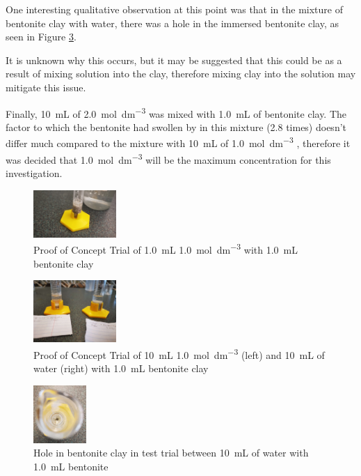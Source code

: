 \documentclass[11pt, letterpaper]{article}
\begin{document}
One interesting qualitative observation at this point was that
in the mixture of bentonite clay with water, there was a hole
in the immersed bentonite clay, as seen in Figure \ref*{fig:hole}.

It is unknown why this occurs, but it may be suggested that
this could be as a result of mixing solution into the clay,
therefore mixing clay into the solution may mitigate this issue.

Finally, \SI{10}{mL} of \SI{2.0}{mol.dm^{-3}} was mixed with \SI{1.0}{mL}
of bentonite clay. The factor to which the bentonite had swollen by
in this mixture (2.8 times) doesn't differ much compared to the
mixture with \SI{10}{mL} of \SI{1.0}{mol.dm^{-3}} , therefore
it was decided that \SI{1.0}{mol.dm^{-3}} will be the maximum
concentration for this investigation.






\begin{paracol}{3}

    \begin{figure}[H]
        \centering
        \includegraphics[width=0.28\textwidth]{poc1MHCL.jpg}
        \caption{Proof of Concept Trial of \SI{1.0}{mL} \SI{1.0}{mol.dm^{-3}}  with \SI{1.0}{mL} bentonite clay}
        \label{fig:poc1MHCL}
    \end{figure}
    \switchcolumn


    \begin{figure}[H]
        \centering
        \includegraphics[width=0.28\textwidth]{betterPOC.jpg}
        \caption{Proof of Concept Trial of \SI{10}{mL} \SI{1.0}{mol.dm^{-3}}  (left) and \SI{10}{mL} of water (right) with \SI{1.0}{mL} bentonite clay}
        \label{fig:betterPOC}
    \end{figure}

    \switchcolumn
    \begin{figure}[H]
        \centering
        \includegraphics[width=0.18\textwidth]{hole.jpg}
        \caption{Hole in bentonite clay in test trial between \SI{10}{mL} of water with \SI{1.0}{mL} bentonite}
        \label{fig:hole}
    \end{figure}

\end{paracol}
\end{document}
